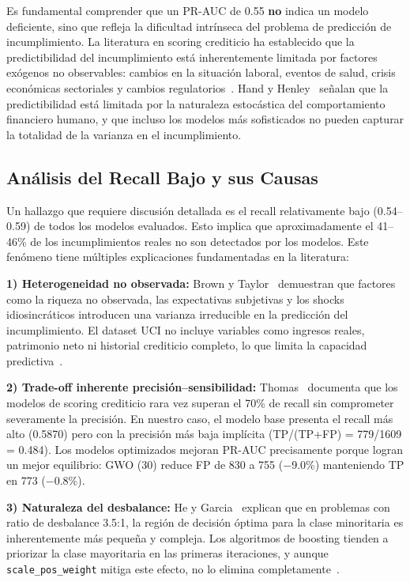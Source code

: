 \documentclass[journal]{IEEEtran}
\begin{document}
Es fundamental comprender que un PR-AUC de 0.55 \textbf{no} indica un modelo deficiente, sino que refleja la dificultad intrínseca del problema de predicción de incumplimiento. La literatura en scoring crediticio ha establecido que la predictibilidad del incumplimiento está inherentemente limitada por factores exógenos no observables: cambios en la situación laboral, eventos de salud, crisis económicas sectoriales y cambios regulatorios~\cite{brown2008, thomas2000}. Hand y Henley~\cite{hand1997} señalan que la predictibilidad está limitada por la naturaleza estocástica del comportamiento financiero humano, y que incluso los modelos más sofisticados no pueden capturar la totalidad de la varianza en el incumplimiento.

\subsection{Análisis del Recall Bajo y sus Causas}
Un hallazgo que requiere discusión detallada es el recall relativamente bajo (0.54--0.59) de todos los modelos evaluados. Esto implica que aproximadamente el 41--46\% de los incumplimientos reales no son detectados por los modelos. Este fenómeno tiene múltiples explicaciones fundamentadas en la literatura:

\textbf{1) Heterogeneidad no observada:} Brown y Taylor~\cite{brown2008} demuestran que factores como la riqueza no observada, las expectativas subjetivas y los shocks idiosincráticos introducen una varianza irreducible en la predicción del incumplimiento. El dataset UCI no incluye variables como ingresos reales, patrimonio neto ni historial crediticio completo, lo que limita la capacidad predictiva~\cite{yeh2009}.

\textbf{2) Trade-off inherente precisión--sensibilidad:} Thomas~\cite{thomas2000} documenta que los modelos de scoring crediticio rara vez superan el 70\% de recall sin comprometer severamente la precisión. En nuestro caso, el modelo base presenta el recall más alto (0.5870) pero con la precisión más baja implícita (TP/(TP+FP) = 779/1609 = 0.484). Los modelos optimizados mejoran PR-AUC precisamente porque logran un mejor equilibrio: GWO (30) reduce FP de 830 a 755 ($-$9.0\%) manteniendo TP en 773 ($-$0.8\%).

\textbf{3) Naturaleza del desbalance:} He y Garcia~\cite{he2009} explican que en problemas con ratio de desbalance 3.5:1, la región de decisión óptima para la clase minoritaria es inherentemente más pequeña y compleja. Los algoritmos de boosting tienden a priorizar la clase mayoritaria en las primeras iteraciones, y aunque \texttt{scale\_pos\_weight} mitiga este efecto, no lo elimina completamente~\cite{chen2016}.
\end{document}

